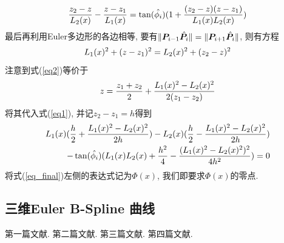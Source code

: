 \documentclass[utf8]{ctexart} %
\begin{document}
	 \begin{equation}\label{eq1}
	 \frac{z_2-z}{\boldmath{L}_2(x)}-\frac{z-z_1}{\boldmath{L}_1(x)} = \tan(\hat{\phi_i})(1+\frac{(z_2-z)(z-z_1)}{\boldmath{L}_1(x)\boldmath{L}_2(x)})
	 \end{equation}
	 最后再利用Euler多边形的各边相等, 要有$\Arrowvert\boldsymbol{P}_{i-1}\hat{\boldsymbol{P}}_i\Arrowvert = \Arrowvert\boldsymbol{P}_{i+1}\hat{\boldsymbol{P}}_i\Arrowvert$, 则有方程
	 \begin{equation}\label{eq2}
	 \boldmath{L}_1(x)^2+(z-z_1)^2 =\boldmath{L}_2(x)^2+(z_2-z)^2
	 \end{equation}
	 注意到式(\ref{eq2})等价于
	 \begin{equation}
	 z = \frac{z_1+z_2}2+\frac{\boldmath{L}_1(x)^2-\boldmath{L}_2(x)^2}{2(z_1-z_2)}
	 \end{equation}
	 将其代入式(\ref{eq1}), 并记$z_2-z_1 = h$得到
	 \begin{equation}\label{eq_final}
	 \begin{aligned}
	 \boldmath{L}_1(x)(\frac h2+\frac{\boldmath{L}_1(x)^2-\boldmath{L}_2(x)^2}{2h})-\boldmath{L}_2(x)(\frac h2-\frac{\boldmath{L}_1(x)^2-\boldmath{L}_2(x)^2}{2h})\\
	 -\tan(\hat{\phi_i})(\boldmath{L}_1(x)\boldmath{L}_2(x)+\frac{h^2}4-\frac{(\boldmath{L}_1(x)^2-\boldmath{L}_2(x)^2)^2}{4h^2})=0
	 \end{aligned}
	 \end{equation}
	 将式(\ref{eq_final})左侧的表达式记为$\Phi(x)$, 我们即要求$\Phi(x)$的零点. 
	 
	 
	 
	 
	 \subsection{三维Euler B-Spline 曲线}
		
		
		\renewcommand\refname{参考文献}
		\begin{thebibliography}{100}%
				第一篇文献.
				第二篇文献.
				第三篇文献.
				第四篇文献.
		\end{thebibliography}  
\end{document}
